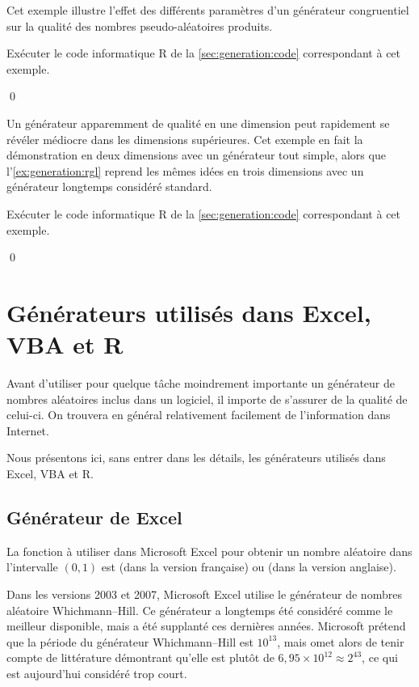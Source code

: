 \begin{exemple}
  \label{exemple:generation:rand}
  Cet exemple illustre l'effet des différents paramètres d'un
  générateur congruentiel sur la qualité des nombres pseudo-aléatoires
  produits.

  \begin{gotoR}
    Exécuter le code informatique R de la
    \autoref{sec:generation:code} correspondant à cet exemple.
  \end{gotoR}
  \qed
\end{exemple}

\begin{exemple}
  Un générateur apparemment de qualité en une dimension peut
  rapidement se révéler médiocre dans les dimensions supérieures. Cet
  exemple en fait la démonstration en deux dimensions avec un
  générateur tout simple, alors que l'\autoref{ex:generation:rgl}
  reprend les mêmes idées en trois dimensions avec un générateur
  longtemps considéré standard.

  \begin{gotoR}
    Exécuter le code informatique R de la
    \autoref{sec:generation:code} correspondant à cet exemple.
  \end{gotoR}
  \qed
\end{exemple}


\section{Générateurs utilisés dans Excel, VBA et R}

Avant d'utiliser pour quelque tâche moindrement importante un
générateur de nombres aléatoires inclus dans un logiciel, il importe
de s'assurer de la qualité de celui-ci. On trouvera en général
relativement facilement de l'information dans Internet.

Nous présentons ici, sans entrer dans les détails, les générateurs
utilisés dans Excel, VBA et R.

\subsection{Générateur de Excel}

La fonction à utiliser dans Microsoft Excel pour obtenir un nombre
aléatoire dans l'intervalle $(0, 1)$ est  (dans la
version française) ou  (dans la version anglaise).

Dans les versions 2003 et 2007, Microsoft Excel utilise le générateur
de nombres aléatoire Whichmann--Hill. Ce générateur a longtemps été
considéré comme le meilleur disponible, mais a été supplanté ces
dernières années. Microsoft prétend que la période du générateur
Whichmann--Hill est $10^{13}$, mais omet alors de tenir compte de
littérature démontrant qu'elle est plutôt de $6,95 \times 10^{12}
\approx 2^{43}$, ce qui est aujourd'hui considéré trop court.

